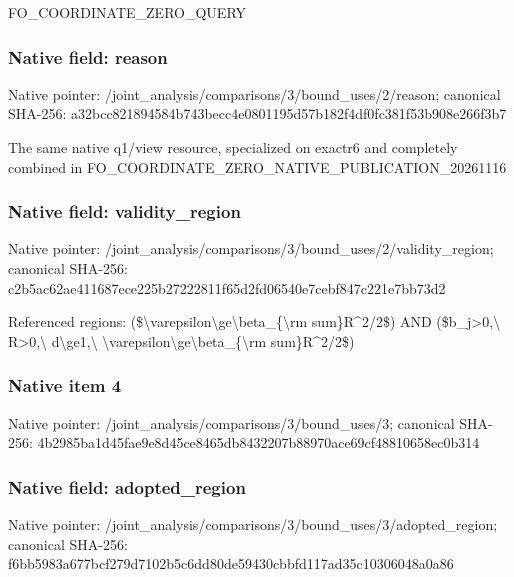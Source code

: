 \documentclass[10pt,a4paper]{article}
\begin{document}
\begingroup\raggedright\sloppy FO\_\allowbreak{}COORDINATE\_\allowbreak{}ZERO\_\allowbreak{}QUERY\par\endgroup

\subsubsection{Native field: reason}
Native pointer: /joint\_\allowbreak{}analysis/comparisons/3/bound\_\allowbreak{}uses/2/reason; canonical SHA-256: a32bcc821894584b743becc4e0801195d57b182f4df0fc381f53b908e266f3b7

\begingroup\raggedright\sloppy The same native q1/\allowbreak{}view resource,\allowbreak{} specialized on exactr6 and completely combined in FO\_\allowbreak{}COORDINATE\_\allowbreak{}ZERO\_\allowbreak{}NATIVE\_\allowbreak{}PUBLICATION\_\allowbreak{}20261116\par\endgroup

\subsubsection{Native field: validity\_\allowbreak{}region}
Native pointer: /joint\_\allowbreak{}analysis/comparisons/3/bound\_\allowbreak{}uses/2/validity\_\allowbreak{}region; canonical SHA-256: c2b5ac62ae411687ece225b27222811f65d2fd06540e7cebf847c221e7bb73d2

\begingroup\raggedright\sloppy Referenced regions:\allowbreak{} (\$\textbackslash{}varepsilon\textbackslash{}ge\textbackslash{}beta\_\allowbreak{}\{\textbackslash{}rm sum\}R\textasciicircum{}2/\allowbreak{}2\$) AND (\$b\_\allowbreak{}j>0,\allowbreak{}\textbackslash{} R>0,\allowbreak{}\textbackslash{} d\textbackslash{}ge1,\allowbreak{}\textbackslash{} \textbackslash{}varepsilon\textbackslash{}ge\textbackslash{}beta\_\allowbreak{}\{\textbackslash{}rm sum\}R\textasciicircum{}2/\allowbreak{}2\$)\par\endgroup

\subsubsection{Native item 4}
Native pointer: /joint\_\allowbreak{}analysis/comparisons/3/bound\_\allowbreak{}uses/3; canonical SHA-256: 4b2985ba1d45fae9e8d45ce8465db8432207b88970ace69cf48810658ec0b314

\subsubsection{Native field: adopted\_\allowbreak{}region}
Native pointer: /joint\_\allowbreak{}analysis/comparisons/3/bound\_\allowbreak{}uses/3/adopted\_\allowbreak{}region; canonical SHA-256: f6bb5983a677bcf279d7102b5c6dd80de59430cbbfd117ad35c10306048a0a86
\end{document}

